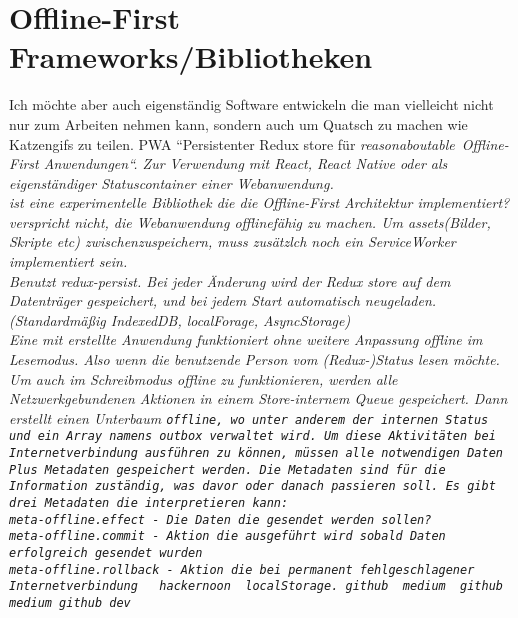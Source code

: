 \section{\label{sec:frameworks}Offline-First Frameworks/Bibliotheken}
  Ich möchte aber auch eigenständig Software entwickeln die man vielleicht nicht nur zum Arbeiten nehmen kann, sondern auch um Quatsch zu machen wie Katzengifs zu teilen.
  \Gls{PWA}
  \cite{realm}
  ``Persistenter Redux store für \it{reasonaboutable}\texttrademark ~Offline-First Anwendungen``. Zur Verwendung mit React, React Native oder als eigenständiger Statuscontainer einer Webanwendung.\\
  ist eine experimentelle Bibliothek die die Offline-First Architektur implementiert?\\
   verspricht nicht, die Webanwendung offlinefähig zu machen. Um \it{assets}(Bilder, Skripte etc) zwischenzuspeichern, muss zusätzlch noch ein ServiceWorker implementiert sein.\\
  Benutzt redux-persist. Bei jeder Änderung wird der Redux store auf dem Datenträger gespeichert, und bei jedem Start automatisch neugeladen. (Standardmäßig IndexedDB, localForage, AsyncStorage)\\
  Eine mit  erstellte Anwendung funktioniert ohne weitere Anpassung offline im Lesemodus. Also wenn die benutzende Person vom (Redux-)Status lesen möchte.
  Um auch im Schreibmodus offline zu funktionieren, werden alle Netzwerkgebundenen Aktionen in einem Store-internem \gls{Queue} gespeichert. Dann erstellt  einen Unterbaum \tt{offline}, wo unter anderem der internen Status und ein Array namens \tt{outbox} verwaltet wird. Um diese Aktivitäten bei Internetverbindung ausführen zu können, müssen alle notwendigen Daten Plus Metadaten gespeichert werden. Die Metadaten sind für die Information zuständig, was davor oder danach passieren soll. Es gibt drei Metadaten die  interpretieren kann:\\
  \tt{meta-offline.effect} - Die Daten die gesendet werden sollen?\\
  \tt{meta-offline.commit} - Aktion die ausgeführt wird sobald Daten erfolgreich gesendet wurden\\
  \tt{meta-offline.rollback} - Aktion die bei permanent fehlgeschlagener Internetverbindung
  ~\cite{redux-offline-gh}
  hackernoon~\cite{redux-offline}
  localStorage. github~\cite{redux-persist-gh} medium~\cite{redux-persist}
  github \cite{rn-offline-gh} medium\cite{rn-offline-medium}
  github\cite{webpack-gh}
  dev\cite{webpack-dev}
  \cite{hoodie}